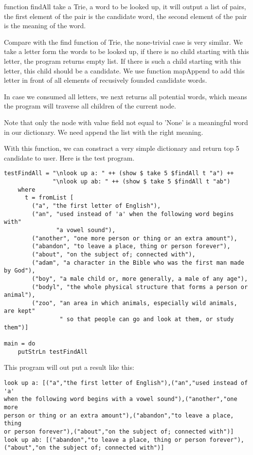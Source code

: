 \documentclass{article}
\begin{document}
function findAll take a Trie, a word to be looked up, it will output
a list of pairs, the first element of the pair is the candidate word,
the second element of the pair is the meaning of the word.

Compare with the find function of Trie, the none-trivial case is very similar.
We take a letter form the words to be looked up, if there is no child starting
with this letter, the program returns empty list. If there is such a child
starting with this letter, this child should be a candidate. We use function
mapAppend to add this letter in front of all elements of recusively founded
candidate words.

In case we consumed all letters, we next returns all potential words, which
means the program will traverse all children of the current node.

Note that only the node with value field not equal to 'None' is a meaningful
word in our dictionary. We need append the list with the right meaning.

With this function, we can constract a very simple dictionary and return
top 5 candidate to user. Here is the test program.

\begin{lstlisting}
testFindAll = "\nlook up a: " ++ (show $ take 5 $findAll t "a") ++
              "\nlook up ab: " ++ (show $ take 5 $findAll t "ab")
    where 
      t = fromList [
        ("a", "the first letter of English"), 
        ("an", "used instead of 'a' when the following word begins with" 
               "a vowel sound"), 
        ("another", "one more person or thing or an extra amount"), 
        ("abandon", "to leave a place, thing or person forever"),
        ("about", "on the subject of; connected with"),
        ("adam", "a character in the Bible who was the first man made by God"),
        ("boy", "a male child or, more generally, a male of any age"), 
        ("bodyl", "the whole physical structure that forms a person or animal"), 
        ("zoo", "an area in which animals, especially wild animals, are kept" 
                " so that people can go and look at them, or study them")]

main = do
    putStrLn testFindAll
\end{lstlisting}

This program will out put a result like this:
\begin{verbatim}
look up a: [("a","the first letter of English"),("an","used instead of 'a' 
when the following word begins with a vowel sound"),("another","one more 
person or thing or an extra amount"),("abandon","to leave a place, thing 
or person forever"),("about","on the subject of; connected with")]
look up ab: [("abandon","to leave a place, thing or person forever"),
("about","on the subject of; connected with")]
\end{verbatim}
\end{document}
